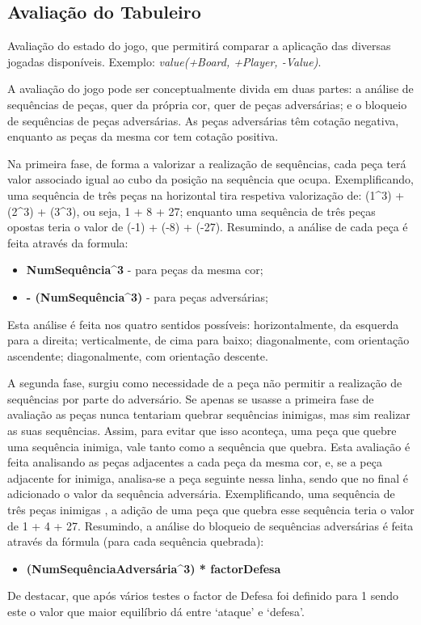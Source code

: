 \documentclass[a4paper]{article}
\begin{document}
\newpage

\subsection{Avaliação do Tabuleiro} Avaliação do estado do jogo, que permitirá comparar a aplicação das diversas jogadas disponíveis. Exemplo: \textit{value(+Board, +Player, -Value)}.

A avaliação do jogo pode ser conceptualmente divida em duas partes: a análise de sequências de peças, quer da própria cor, quer de peças adversárias; e o bloqueio de sequências de peças adversárias. As peças adversárias têm cotação negativa, enquanto as peças da mesma cor tem cotação positiva.

Na primeira fase, de forma a valorizar a realização de sequências, cada peça terá valor associado igual ao cubo da posição na sequência que ocupa. Exemplificando, uma sequência de três peças na horizontal tira respetiva valorização de: (1\textasciicircum3) + (2\textasciicircum3) + (3\textasciicircum3), ou seja, 1 + 8 + 27; enquanto uma sequência de três peças opostas teria o valor de (-1) + (-8) + (-27). Resumindo, a análise de cada peça é feita através da formula:
\begin{itemize}
	\item \textbf{ NumSequência\textasciicircum3} - para peças da mesma cor;
	\item \textbf{- (NumSequência\textasciicircum3)} - para peças adversárias;
\end{itemize}
Esta análise é feita nos quatro sentidos possíveis: horizontalmente, da esquerda para a direita; verticalmente, de cima para baixo; diagonalmente, com orientação ascendente; diagonalmente, com orientação descente.

A segunda fase, surgiu como necessidade de a peça não permitir a realização de sequências por parte do adversário. Se apenas se usasse a primeira fase de avaliação as peças nunca tentariam quebrar sequências inimigas, mas sim realizar as suas sequências. Assim, para evitar que isso aconteça, uma peça que quebre uma sequência inimiga, vale tanto como a sequência que quebra. Esta avaliação é feita analisando as peças adjacentes a cada peça da mesma cor, e, se a peça adjacente for inimiga, analisa-se a peça seguinte nessa linha, sendo que no final é adicionado o valor da sequência adversária. Exemplificando, uma sequência de três peças inimigas , a adição de uma peça que quebra esse sequência teria o valor de 1 + 4 + 27. Resumindo, a análise do bloqueio de sequências adversárias é feita através da fórmula (para cada sequência quebrada):
\begin{itemize}
	\item \textbf{(NumSequênciaAdversária\textasciicircum3) * factorDefesa}
\end{itemize}
De destacar, que após vários testes o factor de Defesa foi definido para 1 sendo este o valor que maior equilíbrio dá entre `ataque' e `defesa'.
\end{document}
